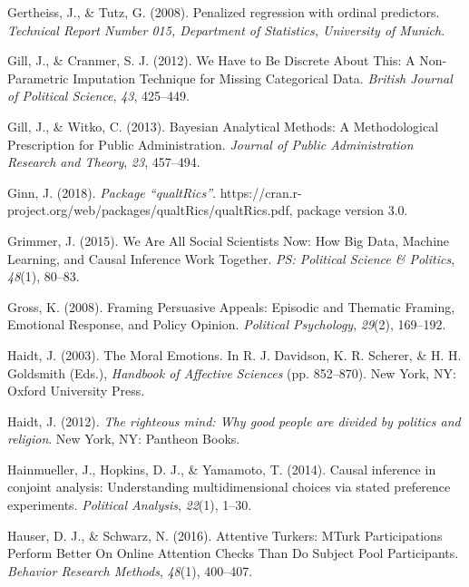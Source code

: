 \documentclass[12pt,econ]{sources/authesis}
\begin{document}
\leavevmode\hypertarget{ref-gertheiss_2008_penalized}{}%
Gertheiss, J., \& Tutz, G. (2008). Penalized regression with ordinal predictors. \emph{Technical Report Number 015, Department of Statistics, University of Munich}.

\leavevmode\hypertarget{ref-gill_2012_have}{}%
Gill, J., \& Cranmer, S. J. (2012). We Have to Be Discrete About This: A Non-Parametric Imputation Technique for Missing Categorical Data. \emph{British Journal of Political Science}, \emph{43}, 425--449.

\leavevmode\hypertarget{ref-gill_2013_bayesian}{}%
Gill, J., \& Witko, C. (2013). Bayesian Analytical Methods: A Methodological Prescription for Public Administration. \emph{Journal of Public Administration Research and Theory}, \emph{23}, 457--494.

\leavevmode\hypertarget{ref-ginn_2018_package}{}%
Ginn, J. (2018). \emph{Package ``qualtRics''}. https://cran.r-project.org/web/packages/qualtRics/qualtRics.pdf, package version 3.0.

\leavevmode\hypertarget{ref-grimmer_2015_social}{}%
Grimmer, J. (2015). We Are All Social Scientists Now: How Big Data, Machine Learning, and Causal Inference Work Together. \emph{PS: Political Science \& Politics}, \emph{48}(1), 80--83.

\leavevmode\hypertarget{ref-gross_framing_2008}{}%
Gross, K. (2008). Framing Persuasive Appeals: Episodic and Thematic Framing, Emotional Response, and Policy Opinion. \emph{Political Psychology}, \emph{29}(2), 169--192.

\leavevmode\hypertarget{ref-haidt_moral_2003}{}%
Haidt, J. (2003). The Moral Emotions. In R. J. Davidson, K. R. Scherer, \& H. H. Goldsmith (Eds.), \emph{Handbook of Affective Sciences} (pp. 852--870). New York, NY: Oxford University Press.

\leavevmode\hypertarget{ref-haidt_2012_righteous}{}%
Haidt, J. (2012). \emph{The righteous mind: Why good people are divided by politics and religion}. New York, NY: Pantheon Books.

\leavevmode\hypertarget{ref-hainmueller_2014_causal}{}%
Hainmueller, J., Hopkins, D. J., \& Yamamoto, T. (2014). Causal inference in conjoint analysis: Understanding multidimensional choices via stated preference experiments. \emph{Political Analysis}, \emph{22}(1), 1--30.

\leavevmode\hypertarget{ref-hauser_attentive_2016}{}%
Hauser, D. J., \& Schwarz, N. (2016). Attentive Turkers: MTurk Participations Perform Better On Online Attention Checks Than Do Subject Pool Participants. \emph{Behavior Research Methods}, \emph{48}(1), 400--407.
\end{document}
